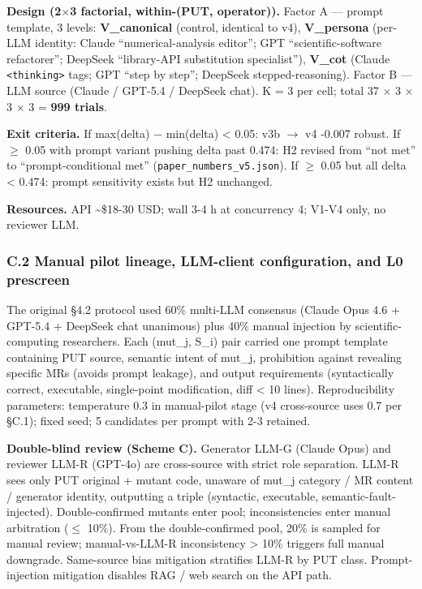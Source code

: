 \documentclass[review,12pt,authoryear]{elsarticle}
\begin{document}
\textbf{Design (2$\times$3 factorial, within-(PUT, operator)).} Factor A ---
prompt template, 3 levels: \textbf{V\_canonical} (control, identical to
v4), \textbf{V\_persona} (per-LLM identity: Claude ``numerical-analysis
editor''; GPT ``scientific-software refactorer''; DeepSeek ``library-API
substitution specialist''), \textbf{V\_cot} (Claude
\texttt{\textless{}thinking\textgreater{}} tags; GPT ``step by step'';
DeepSeek stepped-reasoning). Factor B --- LLM source (Claude / GPT-5.4 /
DeepSeek chat). K = 3 per cell; total 37 $\times$ 3 $\times$ 3 $\times$ 3 = \textbf{999
trials}.

\textbf{Exit criteria.} If max(delta) − min(delta) \textless{} 0.05: v3b
$\to$ v4 -0.007 robust. If $\geq$ 0.05 with prompt variant pushing delta past
0.474: H2 revised from ``not met'' to ``prompt-conditional met''
(\texttt{paper\_numbers\_v5.json}). If $\geq$ 0.05 but all delta \textless{}
0.474: prompt sensitivity exists but H2 unchanged.

\textbf{Resources.} API \textasciitilde\$18-30 USD; wall 3-4 h at
concurrency 4; V1-V4 only, no reviewer LLM.

\subsubsection{C.2 Manual pilot lineage, LLM-client configuration, and
L0
prescreen}\label{c.2-manual-pilot-lineage-llm-client-configuration-and-l0-prescreen}

The original §4.2 protocol used 60\% multi-LLM consensus (Claude Opus
4.6 + GPT-5.4 + DeepSeek chat unanimous) plus 40\% manual injection by
scientific-computing researchers. Each (mut\_j, S\_i) pair carried one
prompt template containing PUT source, semantic intent of mut\_j,
prohibition against revealing specific MRs (avoids prompt leakage), and
output requirements (syntactically correct, executable, single-point
modification, diff \textless{} 10 lines). Reproducibility parameters:
temperature 0.3 in manual-pilot stage (v4 cross-source uses 0.7 per
§C.1); fixed seed; 5 candidates per prompt with 2-3 retained.

\textbf{Double-blind review (Scheme C).} Generator LLM-G (Claude Opus)
and reviewer LLM-R (GPT-4o) are cross-source with strict role
separation. LLM-R sees only PUT original + mutant code, unaware of
mut\_j category / MR content / generator identity, outputting a triple
(syntactic, executable, semantic-fault-injected). Double-confirmed
mutants enter pool; inconsistencies enter manual arbitration ($\leq$ 10\%).
From the double-confirmed pool, 20\% is sampled for manual review;
manual-vs-LLM-R inconsistency \textgreater{} 10\% triggers full manual
downgrade. Same-source bias mitigation stratifies LLM-R by PUT class.
Prompt-injection mitigation disables RAG / web search on the API path.
\end{document}
